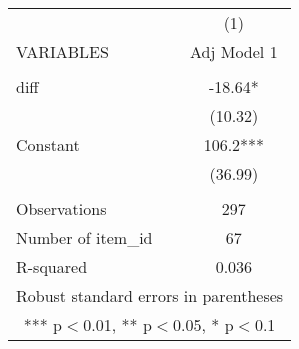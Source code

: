 \documentclass[]{article}
\begin{document}
\begin{tabular}{lc} \hline
 & (1) \\
VARIABLES & Adj Model 1 \\ \hline
 &  \\
diff & -18.64* \\
 & (10.32) \\
Constant & 106.2*** \\
 & (36.99) \\
 &  \\
Observations & 297 \\
Number of item\_id & 67 \\
 R-squared & 0.036 \\ \hline
\multicolumn{2}{c}{ Robust standard errors in parentheses} \\
\multicolumn{2}{c}{ *** p$<$0.01, ** p$<$0.05, * p$<$0.1} \\
\end{tabular}
\end{document}
